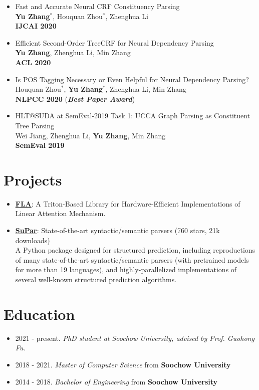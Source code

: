 \documentclass[a4paper,12pt]{article}
\begin{document}
\begin{itemize}[leftmargin=18pt]
\item Fast and Accurate Neural CRF Constituency Parsing\\
    \textbf{Yu Zhang$^*$}, Houquan Zhou$^*$, Zhenghua Li\\
    \textbf{IJCAI 2020}
\item Efficient Second-Order TreeCRF for Neural Dependency Parsing\\
    \textbf{Yu Zhang}, Zhenghua Li, Min Zhang\\
    \textbf{ACL 2020}
\item Is POS Tagging Necessary or Even Helpful for Neural Dependency Parsing?\\
    Houquan Zhou$^*$, \textbf{Yu Zhang$^*$}, Zhenghua Li, Min Zhang\\
    \textbf{NLPCC 2020} (\textbf{\emph{\textcolor{brickred}{Best Paper Award}}})
\item HLT@SUDA at SemEval-2019 Task 1: UCCA Graph Parsing as Constituent Tree Parsing\\
    Wei Jiang, Zhenghua Li, \textbf{Yu Zhang}, Min Zhang\\
    \textbf{SemEval 2019}
\end{itemize}

\section{Projects}
\begin{itemize}[leftmargin=18pt]
\item \href{https://github.com/sustcsonglin/flash-linear-attention}{\textbf{FLA}}: A Triton-Based Library for Hardware-Efficient Implementations of Linear Attention Mechanism.
\item \href{https://github.com/yzhangcs/parser}{\textbf{SuPar}}: State-of-the-art syntactic/semantic parsers (760 stars, 21k downloads)\\
    A Python package designed for structured prediction, including reproductions of many state-of-the-art syntactic/semantic parsers (with pretrained models for more than 19 languages), and highly-parallelized implementations of several well-known structured prediction algorithms.
\end{itemize}

\section{Education}
\begin{itemize}[leftmargin=18pt]
\item 2021 - present. \emph{PhD student at Soochow University, advised by Prof. Guohong Fu.}
\item 2018 - 2021. \emph{Master of Computer Science} from \textbf{Soochow University} 
\item 2014 - 2018. \emph{Bachelor of Engineering} from \textbf{Soochow University} 
\end{itemize}
\end{document}
